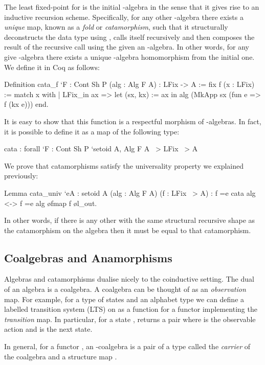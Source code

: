 \documentclass[ a4paper, UKenglish, cleveref, autoref, thm-restate]{lipics-v2021}
\begin{document}
The least fixed-point for  is the initial -algebra in the sense
that it gives rise to an inductive recursion scheme.  Specifically, for any
other -algebra there exists a \emph{unique} map, known as a \emph{fold} or
\emph{catamorphism}, such that it structurally deconstructs the data type
using , calls itself recursively and then composes the result of
the recursive call using the given an -algebra. In other words, for any
give -algebra there exists a unique -algebra homomorphism from the
initial one. We define it in Coq as follows:
\begin{coqcode}
  Definition cata_f `{F : Cont Sh P} (alg : Alg F A) : LFix -> A
:= fix f (x : LFix) := match x with
  | LFix_in ax => let (sx, kx) := ax in alg (MkApp sx (fun e => f (kx e))) end.
\end{coqcode}
It is easy to show that this function is a respectful morphism of
-algebras. In fact, it is possible to define it as a map of the
following type:
\begin{coqcode}
  cata : forall `{F : Cont Sh P} `{setoid A}, Alg F A ~> LFix ~> A
\end{coqcode}
We prove that catamorphisms satisfy the universality property we explained previously:
\begin{coqcode}
Lemma cata_univ `{eA : setoid A} (alg : Alg F A) (f : LFix ~> A)
    : f =e cata alg <-> f =e alg \o fmap f \o l_out.
\end{coqcode}
In other words, if there is any other  with the same structural recursive
shape as the catamorphism on the algebra  then it must be equal to that
catamorphism.

\subsection{Coalgebras and Anamorphisms}
\label{sec:coalg}
Algebras and catamorphisms dualise nicely to the coinductive setting.  The dual
of an algebra is a coalgebra. A coalgebra can be thought of as an
\emph{observation} map. For example, for a type of states  and an
alphabet type  we can define a labelled transition system (LTS)
on  as a function  for a functor 
implementing the \emph{transition} map. In particular, for a
state ,  returns a pair 
where  is the observable action and  is the next state.

In general, for a functor , an -coalgebra is a pair of a
type  called the \emph{carrier} of the coalgebra and a structure
map .
\end{document}
